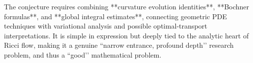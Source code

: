 The conjecture requires combining **curvature evolution identities**, **Bochner formulas**, and **global integral estimates**, connecting geometric PDE techniques with variational analysis and possible optimal‑transport interpretations.  It is simple in expression but deeply tied to the analytic heart of Ricci flow, making it a genuine “narrow entrance, profound depth’’ research problem, and thus a “good’’ mathematical problem.